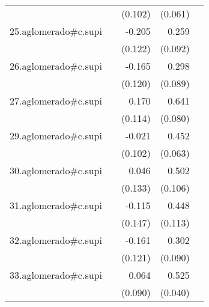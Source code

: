 {\begin{longtable}{l*{4}{D{.}{.}{-1}}}
            &                     &     (0.102)         &     (0.061)         &                     \\
\addlinespace
25.aglomerado#c.supi&                     &      -0.205         &       0.259\sym{**} &                     \\
            &                     &     (0.122)         &     (0.092)         &                     \\
\addlinespace
26.aglomerado#c.supi&                     &      -0.165         &       0.298\sym{***}&                     \\
            &                     &     (0.120)         &     (0.089)         &                     \\
\addlinespace
27.aglomerado#c.supi&                     &       0.170         &       0.641\sym{***}&                     \\
            &                     &     (0.114)         &     (0.080)         &                     \\
\addlinespace
29.aglomerado#c.supi&                     &      -0.021         &       0.452\sym{***}&                     \\
            &                     &     (0.102)         &     (0.063)         &                     \\
\addlinespace
30.aglomerado#c.supi&                     &       0.046         &       0.502\sym{***}&                     \\
            &                     &     (0.133)         &     (0.106)         &                     \\
\addlinespace
31.aglomerado#c.supi&                     &      -0.115         &       0.448\sym{***}&                     \\
            &                     &     (0.147)         &     (0.113)         &                     \\
\addlinespace
32.aglomerado#c.supi&                     &      -0.161         &       0.302\sym{***}&                     \\
            &                     &     (0.121)         &     (0.090)         &                     \\
\addlinespace
33.aglomerado#c.supi&                     &       0.064         &       0.525\sym{***}&                     \\
            &                     &     (0.090)         &     (0.040)         &                     \\

\end{longtable}}
